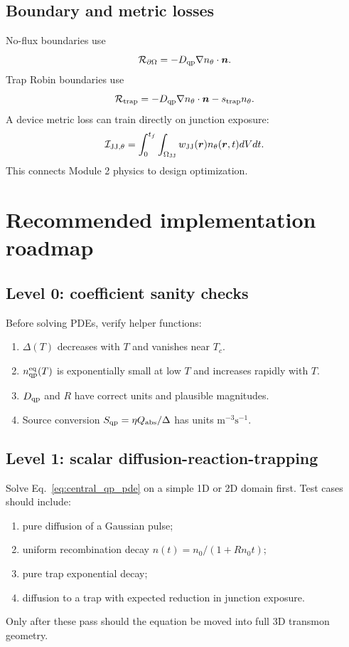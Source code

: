 \documentclass[11pt]{article}
\newcommand{\br}{{\bm{r}}}
\newcommand{\trap}{\mathrm{trap}}
\newcommand{\eq}{\mathrm{eq}}
\newcommand{\JJvol}{\Omega_{\mathrm{JJ}}}
\begin{document}
\subsection{Boundary and metric losses}
No-flux boundaries use
\begin{equation}
\mathcal{R}_{\partial\Omega}=-D_{\mathrm{qp}}\nabla n_{\theta}\cdot\bm{n}.
\end{equation}
Trap Robin boundaries use
\begin{equation}
\mathcal{R}_{\trap}=-D_{\qp}\nabla n_{\theta}\cdot\nvec-s_{\trap}n_{\theta}.
\end{equation}
A device metric loss can train directly on junction exposure:
\begin{equation}
\mathcal{I}_{\JJ,\theta}=\int_0^{t_f}\int_{\JJvol}w_{\JJ}(\br)n_{\theta}(\br,t)dVdt.
\end{equation}
This connects Module 2 physics to design optimization.

\section{Recommended implementation roadmap}

\subsection{Level 0: coefficient sanity checks}
Before solving PDEs, verify helper functions:
\begin{enumerate}[leftmargin=1.6em]
    \item $\Delta(T)$ decreases with $T$ and vanishes near $T_c$.
    \item $n_{\qp}^{\eq}(T)$ is exponentially small at low $T$ and increases rapidly with $T$.
    \item $D_{\mathrm{qp}}$ and $R$ have correct units and plausible magnitudes.
    \item Source conversion $S_{\mathrm{qp}}=\eta Q_{\mathrm{abs}}/\Delta$ has units $\mathrm{m}^{-3}\mathrm{s}^{-1}$.
\end{enumerate}

\subsection{Level 1: scalar diffusion-reaction-trapping}
Solve Eq.~\eqref{eq:central_qp_pde} on a simple 1D or 2D domain first. Test cases should include:
\begin{enumerate}[leftmargin=1.6em]
    \item pure diffusion of a Gaussian pulse;
    \item uniform recombination decay $n(t)=n_0/(1+Rn_0t)$;
    \item pure trap exponential decay;
    \item diffusion to a trap with expected reduction in junction exposure.
\end{enumerate}
Only after these pass should the equation be moved into full 3D transmon geometry.
\end{document}
